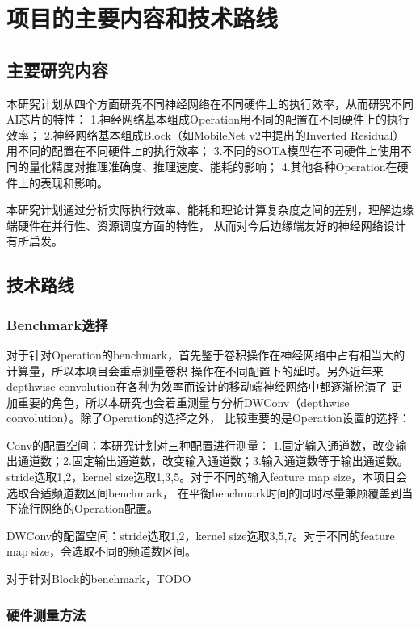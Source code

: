 \section{项目的主要内容和技术路线}

\subsection{主要研究内容}

本研究计划从四个方面研究不同神经网络在不同硬件上的执行效率，从而研究不同AI芯片的特性：
1.神经网络基本组成Operation用不同的配置在不同硬件上的执行效率；
2.神经网络基本组成Block（如MobileNet v2中提出的Inverted Residual）用不同的配置在不同硬件上的执行效率；
3.不同的SOTA模型在不同硬件上使用不同的量化精度对推理准确度、推理速度、能耗的影响；
4.其他各种Operation在硬件上的表现和影响。

本研究计划通过分析实际执行效率、能耗和理论计算复杂度之间的差别，理解边缘端硬件在并行性、资源调度方面的特性，
从而对今后边缘端友好的神经网络设计有所启发。

\subsection{技术路线}

\subsubsection{Benchmark选择}

对于针对Operation的benchmark，首先鉴于卷积操作在神经网络中占有相当大的计算量，所以本项目会重点测量卷积
操作在不同配置下的延时。另外近年来depthwise convolution在各种为效率而设计的移动端神经网络中都逐渐扮演了
更加重要的角色，所以本研究也会着重测量与分析DWConv（depthwise convolution）。除了Operation的选择之外，
比较重要的是Operation设置的选择：

Conv的配置空间：本研究计划对三种配置进行测量：
1.固定输入通道数，改变输出通道数；2.固定输出通道数，改变输入通道数；3.输入通道数等于输出通道数。
stride选取{1,2}，kernel size选取{1,3,5}。对于不同的输入feature map size，本项目会选取合适频道数区间benchmark，
在平衡benchmark时间的同时尽量兼顾覆盖到当下流行网络的Operation配置。

DWConv的配置空间：stride选取{1,2}，kernel size选取{3,5,7}。对于不同的feature map size，会选取不同的频道数区间。

对于针对Block的benchmark，TODO

\subsubsection{硬件测量方法}

